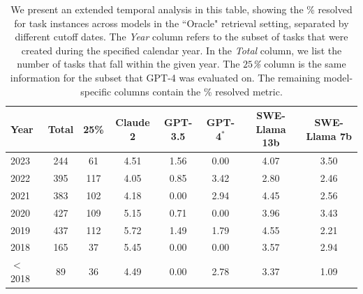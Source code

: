 \begin{table}[ht]
\centering
\begin{tabular}{lcc|ccccc}
\toprule
    Year & Total & 25\% & Claude 2 & GPT-3.5 & GPT-4$^*$ & SWE-Llama 13b & SWE-Llama 7b \\
\midrule
    2023        & 244 & 61  & 4.51 & 1.56 & 0.00 & 4.07 & 3.50 \\
    2022        & 395 & 117 & 4.05 & 0.85 & 3.42 & 2.80 & 2.46 \\
    2021        & 383 & 102 & 4.18 & 0.00 & 2.94 & 4.45 & 2.56 \\
    2020        & 427 & 109 & 5.15 & 0.71 & 0.00 & 3.96 & 3.43 \\
    2019        & 437 & 112 & 5.72 & 1.49 & 1.79 & 4.55 & 2.21 \\
    2018        & 165 & 37  & 5.45 & 0.00 & 0.00 & 3.57 & 2.94 \\
    $<$ 2018 & 89  & 36  & 4.49 & 0.00 & 2.78 & 3.37 & 1.09 \\
\bottomrule
\end{tabular}
\caption{
We present an extended temporal analysis in this table, showing the \% resolved for task instances across models in the ``Oracle" retrieval setting, separated by different cutoff dates. The \textit{Year} column refers to the subset of tasks that were created during the specified calendar year. In the \textit{Total} column, we list the number of tasks that fall within the given year. The \textit{$25$\%} column is the same information for the subset that GPT-4 was evaluated on. The remaining model-specific columns contain the \% resolved metric.
}
\label{appx:temporal-results-extended}
\end{table}